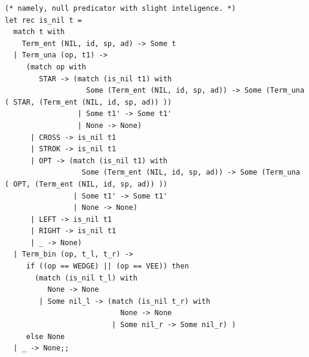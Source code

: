 \documentclass[12pt]{article}
\begin{document}
\begin{tiny}
\begin{verbatim}
(* namely, null predicator with slight inteligence. *)
let rec is_nil t =
  match t with
    Term_ent (NIL, id, sp, ad) -> Some t
  | Term_una (op, t1) ->
     (match op with
        STAR -> (match (is_nil t1) with
                   Some (Term_ent (NIL, id, sp, ad)) -> Some (Term_una ( STAR, (Term_ent (NIL, id, sp, ad)) ))
                 | Some t1' -> Some t1'
                 | None -> None)
      | CROSS -> is_nil t1
      | STROK -> is_nil t1
      | OPT -> (match (is_nil t1) with
                  Some (Term_ent (NIL, id, sp, ad)) -> Some (Term_una ( OPT, (Term_ent (NIL, id, sp, ad)) ))
                | Some t1' -> Some t1'
                | None -> None)
      | LEFT -> is_nil t1
      | RIGHT -> is_nil t1
      | _ -> None)
  | Term_bin (op, t_l, t_r) ->
     if ((op == WEDGE) || (op == VEE)) then
       (match (is_nil t_l) with
          None -> None
        | Some nil_l -> (match (is_nil t_r) with
                           None -> None
                         | Some nil_r -> Some nil_r) )
     else None
  | _ -> None;;



\end{verbatim}
\end{tiny}
\end{document}
